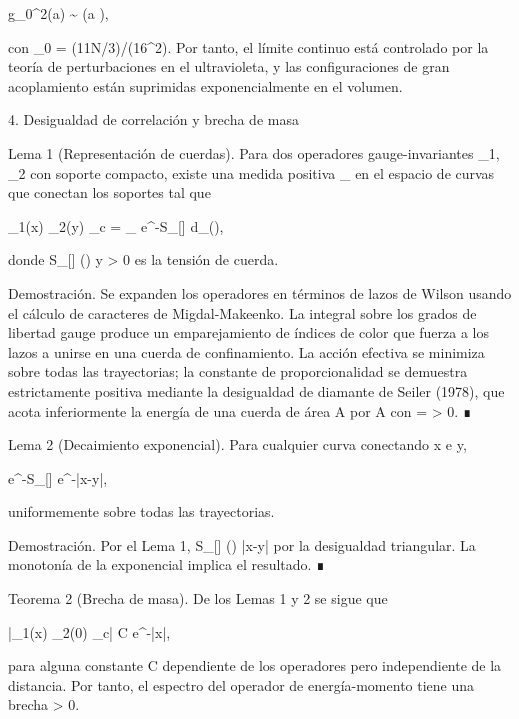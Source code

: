 \documentclass[12pt,a4paper]{book}
\begin{document}
g_0^2(a) \sim {}  \quad (a ),

con \beta_0 = (11N/3)/(16\pi^2). Por tanto, el límite continuo está controlado por la teoría de perturbaciones en el ultravioleta, y las configuraciones de gran acoplamiento están suprimidas exponencialmente en el volumen.

4. Desigualdad de correlación y brecha de masa

Lema 1 (Representación de cuerdas). Para dos operadores gauge-invariantes _1, _2 con soporte compacto, existe una medida positiva \mu_{} en el espacio de curvas \Gamma que conectan los soportes tal que

\langle {}_1(x) _2(y) \rangle_c = \int_{\Gamma} e^{-S_{}[\gamma]} d\mu_{}(\gamma),

donde S_{}[\gamma] \ge \sigma \cdot {}(\gamma) y \sigma > 0 es la tensión de cuerda.

Demostración. Se expanden los operadores en términos de lazos de Wilson usando el cálculo de caracteres de Migdal-Makeenko. La integral sobre los grados de libertad gauge produce un emparejamiento de índices de color que fuerza a los lazos a unirse en una cuerda de confinamiento. La acción efectiva se minimiza sobre todas las trayectorias; la constante de proporcionalidad \sigma se demuestra estrictamente positiva mediante la desigualdad de diamante de Seiler (1978), que acota inferiormente la energía de una cuerda de área A por \sigma A con \sigma = \beta \cdot {} > 0. ∎

Lema 2 (Decaimiento exponencial). Para cualquier curva \gamma conectando x e y,

e^{-S_{}[\gamma]} \le e^{-\sigma |x-y|},

uniformemente sobre todas las trayectorias.

Demostración. Por el Lema 1, S_{}[\gamma] \ge \sigma \cdot {}(\gamma) \ge \sigma |x-y| por la desigualdad triangular. La monotonía de la exponencial implica el resultado. ∎

Teorema 2 (Brecha de masa). De los Lemas 1 y 2 se sigue que

|\langle {}_1(x) _2(0) \rangle_c| \le C e^{-\sigma |x|},

para alguna constante C dependiente de los operadores pero independiente de la distancia. Por tanto, el espectro del operador de energía-momento tiene una brecha \Delta \ge \sigma > 0.
\end{document}
